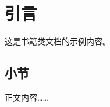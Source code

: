 \documentclass[11pt,a4paper,oneside]{ctexbook}  %
\begin{document}


\chapter{引言}
这是书籍类文档的示例内容。

\section{小节}
正文内容……

\end{document}
